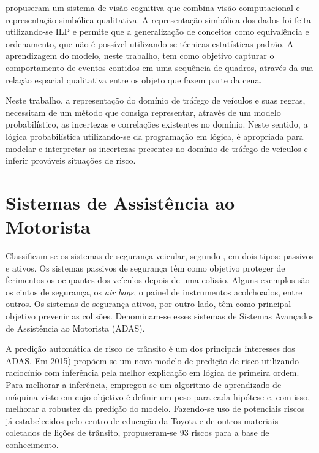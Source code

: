 \documentclass[
	12pt,				%
    oneside,			%
	a4paper,			%
	english,			%
	french,				%
	spanish,			%
	brazil,				%
	]{abntex2}
\begin{document}
 propuseram um sistema de visão cognitiva que combina visão computacional e representação simbólica qualitativa. A representação simbólica dos dados foi feita utilizando-se ILP e permite que a generalização de conceitos como equivalência e ordenamento, que não é possível utilizando-se técnicas estatísticas padrão.  A aprendizagem do modelo, neste trabalho, tem como objetivo capturar o comportamento de eventos contidos em uma sequência de quadros, através da sua relação espacial qualitativa entre os objeto que fazem parte da cena.

Neste trabalho, a representação do domínio de tráfego de veículos e suas regras, necessitam de um método que consiga representar, através de um modelo probabilístico, as incertezas e correlações existentes no domínio. Neste sentido, a lógica probabilística utilizando-se da programação em lógica, é apropriada para modelar e interpretar as incertezas presentes no domínio de tráfego de veículos e inferir prováveis situações de risco.

\section {Sistemas de Assistência ao Motorista}

Classificam-se os sistemas de segurança veicular, segundo  , em dois tipos: passivos e ativos. Os sistemas passivos de segurança têm como objetivo proteger de ferimentos os ocupantes dos veículos depois de uma colisão. Alguns exemplos são os cintos de segurança, os \textit{air bags}, o painel de instrumentos acolchoados, entre outros. Os sistemas de segurança ativos, por outro lado, têm como principal objetivo prevenir as colisões. Denominam-se esses sistemas de Sistemas Avançados de Assistência ao Motorista (ADAS).

A predição automática de risco de trânsito é um dos principais interesses dos ADAS. Em  2015) propõem-se um novo modelo de predição de risco utilizando raciocínio com inferência pela melhor explicação em lógica de primeira ordem. Para melhorar a inferência, empregou-se um algoritmo de aprendizado de máquina visto em  cujo objetivo é definir um peso para cada hipótese e, com isso, melhorar a robustez da predição do modelo. Fazendo-se uso de potenciais riscos já estabelecidos pelo centro de educação da Toyota e de outros materiais coletados de lições de trânsito, propuseram-se 93 riscos para a base de conhecimento.
\end{document}
